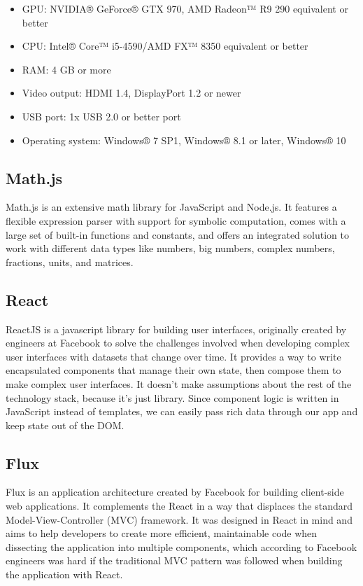 \begin{itemize}
\item{GPU: NVIDIA® GeForce® GTX 970, AMD Radeon™ R9 290 equivalent or better}
\item{CPU: Intel® Core™ i5-4590/AMD FX™ 8350 equivalent or better}
\item{RAM: 4 GB or more}
\item{Video output: HDMI 1.4, DisplayPort 1.2 or newer}
\item{USB port: 1x USB 2.0 or better port}
\item{Operating system: Windows® 7 SP1, Windows® 8.1 or later, Windows® 10}
\end{itemize}

\subsection{Math.js}
Math.js is an extensive math library for JavaScript and Node.js. It features a flexible expression parser with support for symbolic computation, comes with a large set of built-in functions and constants, and offers an integrated solution to work with different data types like numbers, big numbers, complex numbers, fractions, units, and matrices.

\subsection{React}
ReactJS is a javascript library for building user interfaces, originally created by engineers at Facebook to solve the challenges involved when developing complex user interfaces with datasets that change over time. It provides a way to write encapsulated components that manage their own state, then compose them to make complex user interfaces. It doesn't make assumptions about the rest of the technology stack, because it’s just library. Since component logic is written in JavaScript instead of templates, we can easily pass rich data through our app and keep state out of the DOM.

\subsection{Flux}
Flux is an application architecture created by Facebook for building client-side web applications. It complements the React in a way that displaces the standard Model-View-Controller (MVC) framework. It was designed in React in mind and aims to help developers to create more efficient, maintainable code when dissecting the application into multiple components, which according to Facebook engineers was hard if the traditional MVC pattern was followed when building the application with React.\citep{gackenheimer}

